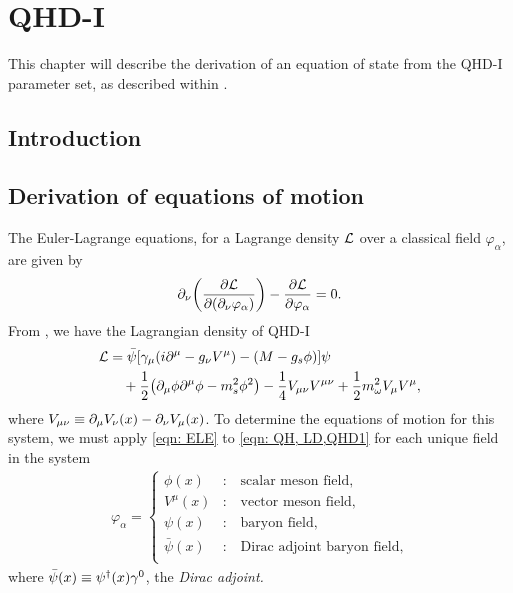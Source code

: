 \chapter{QHD-I}

This chapter will describe the derivation of an equation of state from the QHD-I parameter set, as described within \autocite{diener_2008}.

\section{Introduction}


\section{Derivation of equations of motion}

The Euler-Lagrange equations, for a Lagrange density $\mathcal{L}$ over a classical field $\varphi_\alpha$, are given by
\begin{align}\label{eqn: ELE}
    \partial_\nu\qty(\pdv{\mathcal{L}}{(\partial_\nu \varphi_\alpha)}) - \pdv{\mathcal{L}}{\varphi_\alpha} = 0.
\end{align}
From \autocite[p. 56]{diener_2008}, we have the Lagrangian density of QHD-I
\begin{align} \label{eqn: QH, LD,QHD1}
    \Lag & = \bar{\psi} \bqty{\gamma_\mu(i\p^\mu -g_\nu V^\mu) - (M-g_s\phi)} \psi \nonumber\\
    & \quad + \frac{1}{2} \pqty{\p_\mu \phi \p^\mu \phi - m_s^2 \phi^2} - \frac{1}{4} V_{\mu\nu}V^{\mu\nu} + \frac{1}{2} m_\omega^2 V_\mu V^\mu,
\end{align}
where $V_{\mu\nu}\equiv\partial_\mu V_\nu (x) - \partial_\nu V_\mu(x)$. To determine the equations of motion for this system, we must apply \eqref{eqn: ELE} to \eqref{eqn: QH, LD,QHD1} for each unique field in the system
\begin{align*}
    \varphi_\alpha = \begin{cases}
        \phi(x) &: \quad \text{scalar meson field,}\\
        V^\mu(x) &: \quad \text{vector meson field,}\\
        \psi(x) &: \quad \text{baryon field,}\\
        \bar\psi(x) &: \quad \text{Dirac adjoint baryon field,}\\
    \end{cases}
\end{align*}
where $\bar\psi(x) \equiv \psi^\dagger(x)\gamma^0$, the \emph{Dirac adjoint.}


